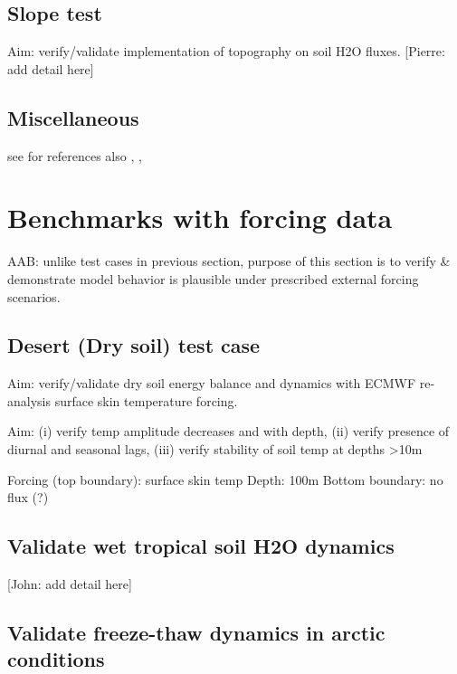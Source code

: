 \documentclass[twoside,10pt]{report}
\begin{document}
\subsection{Slope test}
Aim: verify/validate implementation of topography on soil H2O fluxes.
[Pierre: add detail here]

\subsection{Miscellaneous}

see \citet{Clark15a} for references
also \citet{Maxwell14a},   \citet{kollet2017integrated}, \citet{Toth62a}




\section{Benchmarks with forcing data}



AAB: unlike test cases in previous section, purpose of this section is to verify \& demonstrate model behavior is plausible under prescribed external forcing scenarios.

\subsection{Desert (Dry soil) test case}
Aim: verify/validate dry soil energy balance and dynamics with ECMWF re-analysis surface skin temperature forcing. 

Aim: (i) verify temp amplitude decreases and with depth, (ii) verify presence of diurnal and seasonal lags, (iii) verify stability of soil temp at depths >10m

Forcing (top boundary): surface skin temp
Depth: 100m
Bottom boundary: no flux (?)


\subsection{Validate wet tropical soil H2O dynamics}
[John: add detail here]


\subsection{Validate freeze-thaw dynamics in arctic conditions}
\end{document}
